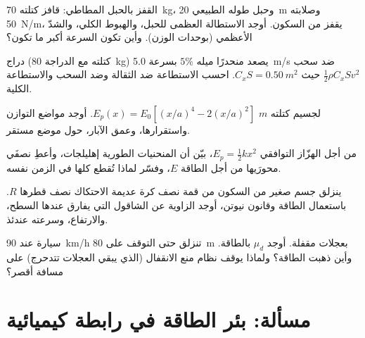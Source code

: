 \begin{exercise}[$\star\star$]\label{exo:b1:work-and-energy:7}
القفز بالحبل المطاطي: قافز كتلته \qty{70}{kg}، وحبل طوله الطبيعي \qty{20}{m}
وصلابته \qty{50}{N/m}، يقفز من السكون. أوجد الاستطالة العظمى
للحبل، والهبوط الكلي، والشدّ الأعظمي (بوحدات الوزن). وأين تكون
السرعة أكبر ما تكون؟
\end{exercise}

\begin{exercise}[$\star\star$]\label{exo:b1:work-and-energy:8}
دراج (كتلته مع الدراجة \qty{80}{kg}) يصعد منحدرًا ميله $5\%$ بسرعة \qty{5.0}{m/s}
ضد سحب $\tfrac12\rho C_xSv^2$ حيث $C_xS = \qty{0.50}{m^2}$.
احسب الاستطاعة ضد الثقالة وضد السحب والاستطاعة الكلية.
\end{exercise}

\begin{exercise}[$\star\star$]\label{exo:b1:work-and-energy:9}
لجسيم كتلته $m$  $E_p(x) = E_0[(x/a)^4 - 2(x/a)^2]$. أوجد
مواضع التوازن واستقرارها، وعمق الآبار،   حول موضع مستقر.
\end{exercise}

\begin{exercise}[$\star\star\star$]\label{exo:b1:work-and-energy:10}
من أجل الهزّاز التوافقي $E_p = \tfrac12 kx^2$، بيّن أن المنحنيات
الطورية إهليلجات، وأعطِ نصفَي محورَيها من أجل الطاقة $E$، وفسّر
لماذا تُقطع كلها في الزمن نفسه.
\end{exercise}

\begin{exercise}[$\star\star\star$]\label{exo:b1:work-and-energy:11}
ينزلق جسم صغير من السكون من قمة نصف كرة عديمة الاحتكاك
نصف قطرها $R$. باستعمال الطاقة وقانون نيوتن، أوجد الزاوية عن
الشاقول التي يفارق عندها السطح، والارتفاع، وسرعته
عندئذ.
\end{exercise}

\begin{exercise}[$\star\star\star$]\label{exo:b1:work-and-energy:12}
سيارة عند \qty{90}{km/h} تنزلق حتى التوقف على \qty{80}{m} بعجلات
مقفلة. أوجد $\mu_d$ بالطاقة. وأين ذهبت الطاقة؟ ولماذا يوقف
نظام منع الانقفال (الذي يبقي العجلات تتدحرج) على مسافة أقصر؟
\end{exercise}

\section{مسألة: بئر الطاقة في رابطة كيميائية}

